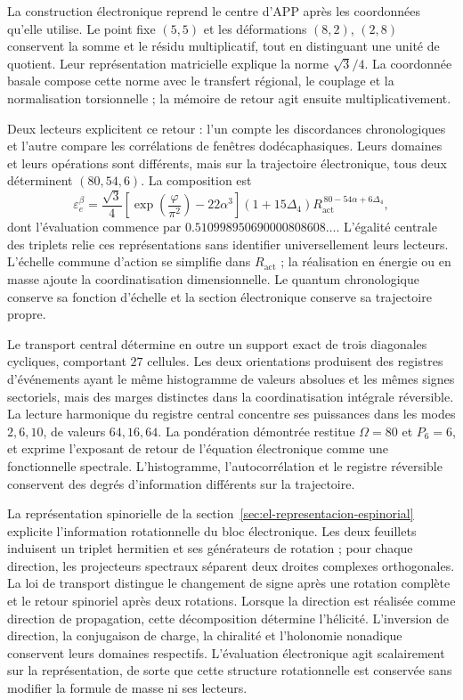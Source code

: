 La construction électronique reprend le centre d'APP après les coordonnées qu'elle utilise. Le point fixe \((5,5)\) et les déformations \((8,2)\), \((2,8)\) conservent la somme et le résidu multiplicatif, tout en distinguant une unité de quotient. Leur représentation matricielle explique la norme \(\sqrt3/4\). La coordonnée basale compose cette norme avec le transfert régional, le couplage et la normalisation torsionnelle ; la mémoire de retour agit ensuite multiplicativement.

Deux lecteurs explicitent ce retour : l'un compte les discordances chronologiques et l'autre compare les corrélations de fenêtres dodécaphasiques. Leurs domaines et leurs opérations sont différents, mais sur la trajectoire électronique, tous deux déterminent \((80,54,6)\). La composition est
\[
 \varepsilon_e^\beta
 =\frac{\sqrt3}{4}
 \left[\exp\!\left(\frac{\varphi}{\pi^2}\right)-22\alpha^3\right]
 (1+15\Delta_4)
 R_{\mathrm{act}}^{\,80-54\alpha+6\Delta_4},
\]
dont l'évaluation commence par \(0.510998950690000808608\ldots\). L'égalité centrale des triplets relie ces représentations sans identifier universellement leurs lecteurs. L'échelle commune d'action se simplifie dans \(R_{\mathrm{act}}\) ; la réalisation en énergie ou en masse ajoute la coordinatisation dimensionnelle. Le quantum chronologique conserve sa fonction d'échelle et la section électronique conserve sa trajectoire propre.

Le transport central détermine en outre un support exact de trois diagonales
cycliques, comportant \(27\) cellules. Les deux orientations produisent des registres
d'événements ayant le même histogramme de valeurs absolues et les mêmes signes
sectoriels, mais des marges distinctes
dans la coordinatisation intégrale réversible. La lecture harmonique du registre central
concentre ses puissances dans les modes \(2,6,10\), de valeurs \(64,16,64\).
La pondération démontrée restitue \(\Omega=80\) et \(P_6=6\), et exprime
l'exposant de retour de l'équation électronique comme une fonctionnelle
spectrale. L'histogramme, l'autocorrélation et le registre réversible
conservent des degrés d'information différents sur la trajectoire.

La représentation spinorielle de la section~\ref{sec:el-representacion-espinorial} explicite l'information rotationnelle du bloc électronique. Les deux feuillets induisent un triplet hermitien et ses générateurs de rotation ; pour chaque direction, les projecteurs spectraux séparent deux droites complexes orthogonales. La loi de transport distingue le changement de signe après une rotation complète et le retour spinoriel après deux rotations. Lorsque la direction est réalisée comme direction de propagation, cette décomposition détermine l'hélicité. L'inversion de direction, la conjugaison de charge, la chiralité et l'holonomie nonadique conservent leurs domaines respectifs. L'évaluation électronique agit scalairement sur la représentation, de sorte que cette structure rotationnelle est conservée sans modifier la formule de masse ni ses lecteurs.

